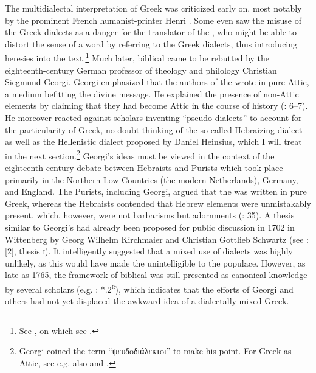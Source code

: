 The multidialectal interpretation of  Greek was criticized early on, most notably by the prominent French humanist-printer Henri \citet[32–33, 138]{Estienne1581}. Some even saw the misuse of the Greek dialects as a danger for the  translator of the , who might be able to distort the sense of a word by referring to the Greek dialects, thus introducing heresies into the text.\footnote{See \citet[429]{Rainolds1583}, on which see \citet[654--655]{VanRooyConsidine2016}.} Much later, biblical  came to be rebutted by the eighteenth-century German professor of theology and philology Christian Siegmund Georgi. Georgi emphasized that the authors of the  wrote in pure Attic, a medium befitting the divine message. He explained the presence of non-Attic elements by claiming that they had become Attic in the course of history (\citealt{Georgi1733}: 6–7). He moreover reacted against scholars inventing “pseudo-dialects” to account for the particularity of  Greek, no doubt thinking of the so-called Hebraizing dialect as well as the Hellenistic dialect proposed by Daniel Heinsius, which I will treat in the next section.\footnote{Georgi coined the term “ψευδoδιάλεκτoι” to make his point. For  Greek as Attic, see e.g. also \citet[3, 10--12]{Georgi1729} and \citet[b.7\textsc{\textsuperscript{r}}–b.8\textsc{\textsuperscript{v}}]{Fischer1754}.} Georgi’s ideas must be viewed in the context of the eighteenth-century debate between Hebraists and Purists which took place primarily in the Northern Low Countries (the modern Netherlands), Germany, and England. The Purists, including Georgi, argued that the  was written in pure Greek, whereas the Hebraists contended that Hebrew elements were unmistakably present, which, however, were not barbarisms but adornments (\citealt{De1980}: 35). A thesis similar to Georgi’s had already been proposed for public discussion in 1702 in Wittenberg by Georg Wilhelm Kirchmaier and Christian Gottlieb Schwartz (see \citealt{Kirchmaier1702}: [2], thesis \textsc{i}). It intelligently suggested that a mixed use of dialects was highly unlikely, as this would have made the  unintelligible to the populace. However, as late as 1765, the framework of biblical  was still presented as canonical knowledge by several scholars (e.g. \citealt{Gottleber1765}: *.2\textsc{\textsuperscript{r}}), which indicates that the efforts of Georgi and others had not yet displaced the awkward idea of a dialectally mixed  Greek.

